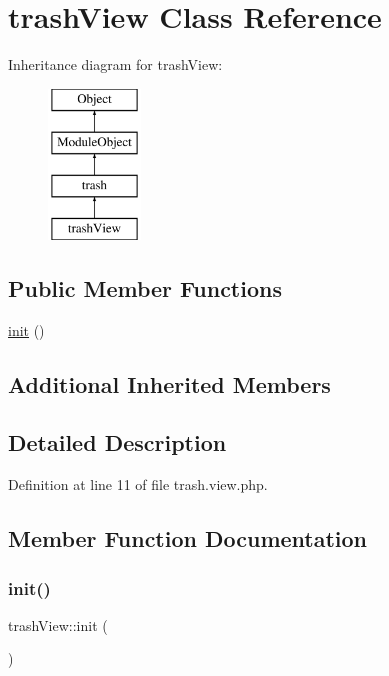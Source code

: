 \hypertarget{classtrashView}{}\section{trash\+View Class Reference}
\label{classtrashView}
Inheritance diagram for trash\+View\+:\begin{figure}[H]
\begin{center}
\leavevmode
\includegraphics[height=4.000000cm]{classtrashView}
\end{center}
\end{figure}
\subsection*{Public Member Functions}
\begin{DoxyCompactItemize}
\item 
\hyperlink{classtrashView_adc7e3f13f2c3914a326bc73c572cceac}{init} ()
\end{DoxyCompactItemize}
\subsection*{Additional Inherited Members}


\subsection{Detailed Description}


Definition at line 11 of file trash.\+view.\+php.



\subsection{Member Function Documentation}
\mbox{\label{classtrashView_adc7e3f13f2c3914a326bc73c572cceac}} 
\subsubsection{\texorpdfstring{init()}{init()}}
{\footnotesize\ttfamily trash\+View\+::init (\begin{DoxyParamCaption}{ }\end{DoxyParamCaption})}

